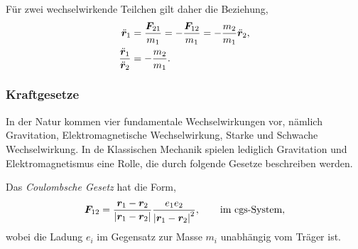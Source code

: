 Für zwei wechselwirkende Teilchen gilt daher die Beziehung,
\begin{align*}
\ddot{\bm{r}}_1 &= \frac{\bm{F}_{21}}{m_1} = - \frac{\bm{F}_{12}}{m_1} = -
\frac{m_2}{m_1}\ddot{\bm{r}}_2,\\
\frac{\ddot{\bm{r}}_1}{\ddot{\bm{r}}_2} &= -\frac{m_2}{m_1}.
\end{align*}

\subsubsection{Kraftgesetze}
In der Natur kommen vier fundamentale Wechselwirkungen vor, nämlich Gravitation,
Elektromagnetische Wechselwirkung, Starke und Schwache Wechselwirkung. In de
Klassischen Mechanik spielen lediglich Gravitation und Elektromagnetismus 
eine Rolle, die durch folgende Gesetze beschreiben werden.

Das \emph{Coulombsche Gesetz} hat die Form,
\begin{align*}
\bm{F}_{12} = \frac{\bm{r}_1-\bm{r}_2}{\left|\bm{r}_1-\bm{r}_2\right|}
\frac{e_1 e_2}{\left|\bm{r}_1-\bm{r}_2\right|^2},\qquad \text{im cgs-System},
\end{align*}
wobei die Ladung $e_i$ im Gegensatz zur Masse $m_i$ unabhängig vom Träger ist.

